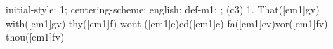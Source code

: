 initial-style: 1;
centering-scheme: english;
def-m1: \grealign;
(c3) 1. That([em1]gv) with([em1]gv) thy([em1]f) wont-([em1]e)ed([em1]c) fa([em1]ev)vor([em1]fv) thou([em1]fv)